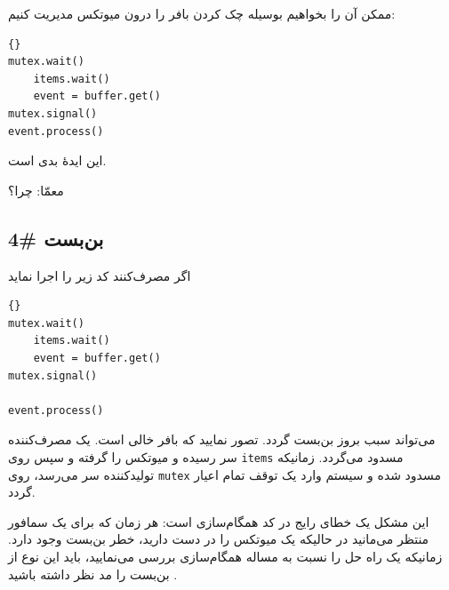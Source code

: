 \documentclass{book}
\newcommand{\clearemptydoublepage}{\newpage\cleardoublepage}
\begin{document}
    ممکن آن را بخواهیم بوسیله چک کردن بافر را درون میوتکس مدیریت کنیم: 

\begin{latin}
\begin{latin}
\begin{lstlisting}[title=\rl{راه حل معیوب مصرف‌کننده}]{}
mutex.wait()
    items.wait()
    event = buffer.get()
mutex.signal()
event.process()
\end{lstlisting}
\end{latin}
\end{latin}

    این ایدهٔ بدی است. 

    معمّا: چرا؟


\clearemptydoublepage
\subsection{بن‌بست \#4}


    اگر مصرف‌کنند کد زیر را اجرا نماید

\begin{latin}
\begin{latin}
\begin{lstlisting}[title=\rl{راه حل معیوب مصرف‌کننده}]{}
mutex.wait()
    items.wait()
    event = buffer.get()
mutex.signal()

event.process()
\end{lstlisting}
\end{latin}
\end{latin}
%
    می‌تواند سبب بروز بن‌بست گردد. تصور نمایید که بافر خالی است. یک مصرف‌کننده سر رسیده و میوتکس را گرفته و سپس روی {\tt items}
    مسدود می‌گردد. زمانیکه تولید‌کننده سر می‌رسد،‌ روی {\tt mutex} مسدود شده و سیستم وارد یک توقف تمام اعیار گردد. 

    این مشکل یک خطای رایج در کد همگام‌سازی است: هر زمان که برای یک سمافور منتظر می‌مانید در حالیکه یک میوتکس را در دست دارید، 
    خطر بن‌بست وجود دارد. زمانیکه یک راه حل را نسبت به مساله همگام‌سازی بررسی می‌نمایید، باید این نوع از بن‌بست را مد نظر داشته باشید .
\end{document}
